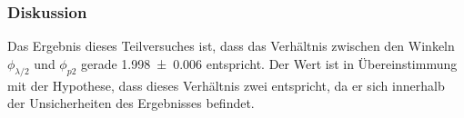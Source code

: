 	\subsubsection*{Diskussion}
	
		Das Ergebnis dieses Teilversuches ist, dass das Verhältnis zwischen den Winkeln $\phi_{\lambda/2}$ und $\phi_{p2}$ gerade \SI{1,998+-0,006}{} entspricht.
		Der Wert ist in Übereinstimmung mit der Hypothese, dass dieses Verhältnis zwei entspricht, da er sich innerhalb der Unsicherheiten des Ergebnisses befindet.
		